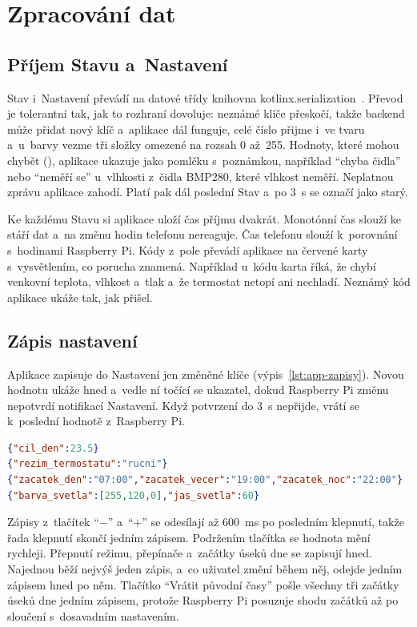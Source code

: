 \section{Zpracování dat}
\label{sec:app-data}

\subsection{Příjem Stavu a~Nastavení}

Stav i~Nastavení převádí na datové třídy knihovna kotlinx.serialization~\cite{app-serializace}.
Převod je tolerantní tak, jak to rozhraní dovoluje: neznámé klíče přeskočí, takže backend může
přidat nový klíč a~aplikace dál funguje, celé číslo přijme i~ve tvaru  a~u~barvy
vezme tři složky omezené na rozsah 0 až~255. Hodnoty, které mohou chybět (), aplikace
ukazuje jako pomlčku s~poznámkou, například \enquote{chyba čidla} nebo \enquote{neměří se} u~vlhkosti
z~čidla BMP280, které vlhkost neměří. Neplatnou zprávu aplikace zahodí. Platí pak dál poslední
Stav a~po 3~s se označí jako starý.

Ke každému Stavu si aplikace uloží čas příjmu dvakrát. Monotónní čas slouží ke stáří dat a~na
změnu hodin telefonu nereaguje. Čas telefonu slouží k~porovnání s~hodinami Raspberry Pi. Kódy
z~pole  převádí aplikace na červené karty s~vysvětlením, co porucha znamená. Například
u~kódu  karta říká, že chybí venkovní teplota, vlhkost a~tlak a~že termostat netopí
ani nechladí. Neznámý kód aplikace ukáže tak, jak přišel.

\subsection{Zápis nastavení}
\label{sec:app-zapis}

Aplikace zapisuje do Nastavení jen změněné klíče (výpis~\ref{lst:app-zapisy}). Novou hodnotu
ukáže hned a~vedle ní točící se ukazatel, dokud Raspberry Pi změnu nepotvrdí notifikací
Nastavení. Když potvrzení do 3~s nepřijde, vrátí se k~poslední hodnotě z~Raspberry Pi.

\begin{lstlisting}[language=json, breaklines=true, caption={Příklady zápisů do Nastavení}, label=lst:app-zapisy]
{"cil_den":23.5}
{"rezim_termostatu":"rucni"}
{"zacatek_den":"07:00","zacatek_vecer":"19:00","zacatek_noc":"22:00"}
{"barva_svetla":[255,120,0],"jas_svetla":60}
\end{lstlisting}

Zápisy z~tlačítek \enquote{$-$} a~\enquote{$+$} se odesílají až 600~ms po posledním klepnutí,
takže řada klepnutí skončí jedním zápisem. Podržením tlačítka se hodnota mění rychleji.
Přepnutí režimu, přepínače a~začátky úseků dne se zapisují hned. Najednou běží nejvýš jeden
zápis, a~co uživatel změní během něj, odejde jedním zápisem hned po něm. Tlačítko \enquote{Vrátit
původní časy} pošle všechny tři začátky úseků dne jedním zápisem, protože Raspberry Pi
posuzuje shodu začátků až po sloučení s~dosavadním nastavením.


